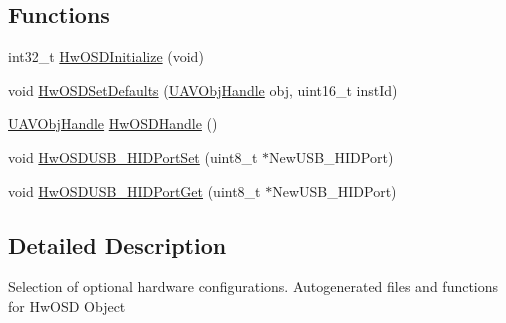 \subsection*{\-Functions}
\begin{DoxyCompactItemize}
\item 
int32\-\_\-t \hyperlink{group___hw_o_s_d_gaa924ebe83da24ae76d4b8b4289a4dace}{\-Hw\-O\-S\-D\-Initialize} (void)
\item 
void \hyperlink{group___hw_o_s_d_gaef923551d8eb7b9d28b7c2d9f7bd9e34}{\-Hw\-O\-S\-D\-Set\-Defaults} (\hyperlink{targets_2_u_a_v_objects_2inc_2uavobjectmanager_8h_a279053e22be53ce9f895043aaeb91e3b}{\-U\-A\-V\-Obj\-Handle} obj, uint16\-\_\-t inst\-Id)
\item 
\hyperlink{targets_2_u_a_v_objects_2inc_2uavobjectmanager_8h_a279053e22be53ce9f895043aaeb91e3b}{\-U\-A\-V\-Obj\-Handle} \hyperlink{group___hw_o_s_d_ga2e0288ea113111ce7be81298f606b180}{\-Hw\-O\-S\-D\-Handle} ()
\item 
void \hyperlink{group___hw_o_s_d_ga3c8c6917f969fccddbfaf8cce7ace78b}{\-Hw\-O\-S\-D\-U\-S\-B\-\_\-\-H\-I\-D\-Port\-Set} (uint8\-\_\-t $\ast$\-New\-U\-S\-B\-\_\-\-H\-I\-D\-Port)
\item 
void \hyperlink{group___hw_o_s_d_ga1d5608440f4bfa5c25c1b0b795edcf3d}{\-Hw\-O\-S\-D\-U\-S\-B\-\_\-\-H\-I\-D\-Port\-Get} (uint8\-\_\-t $\ast$\-New\-U\-S\-B\-\_\-\-H\-I\-D\-Port)
\end{DoxyCompactItemize}


\subsection{\-Detailed \-Description}
\-Selection of optional hardware configurations. \-Autogenerated files and functions for \-Hw\-O\-S\-D \-Object 

